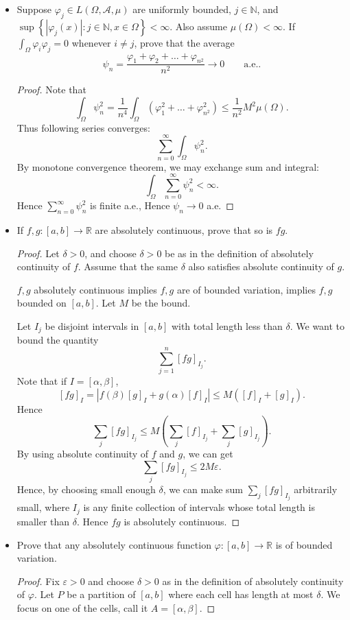 \begin{itemize}
	\item Suppose $\varphi_j \in L(\Omega, \mathcal{A}, \mu)$ are uniformly bounded, $j \in \mathbb{N}$, and $\sup  \left\{ \left| \varphi_j(x) \right| : j \in \mathbb{N} , x \in \Omega\right\}  <\infty $. Also assume $\mu(\Omega) < \infty $. If $\int _\Omega \varphi_i \varphi_j = 0$ whenever $i \neq j$, prove that the average 
		\[
			\psi_n = \frac{\varphi_1 + \varphi_2 + \ldots + \varphi_{n^2}}{n^2} \to 0 \qquad \text{a.e.}
		.\] 
\begin{proof}
	Note that
	\[
		\int_\Omega \psi_n^2 = \frac{1}{n^4}\int _\Omega( \varphi_1 ^2 + \ldots + \varphi_{n^2}^2) \le \frac{1}{n^2} M^2 \mu(\Omega)
	.\] 
	Thus following series converges:
	\[
		\sum_{n = 0}^\infty  \int_\Omega \psi_n^2
	.\] 
	By monotone convergence theorem, we may exchange sum and integral:
\[
		\int_\Omega \sum_{n = 0}^\infty  \psi_n^2< \infty 
	.\]
	Hence $\sum_{n = 0}^\infty  \psi_n^2$ is finite a.e., Hence  $\psi_n \to 0$ a.e.
\end{proof}

	\item If $f, g: [a,b] \to \mathbb{R}$ are absolutely continuous, prove that so is $fg$.
\begin{proof}
	Let $\delta>0$, and choose $\delta>0$ be as in the definition of absolutely continuity of $f$. Assume that the same $\delta$ also satisfies absolute continuity of $g$.

	$f,g$ absolutely continuous implies $f, g$ are of bounded variation, implies $f, g$ bounded on $[a,b]$. Let $M$ be the bound.

	Let  $I_j$ be disjoint intervals in  $[a,b]$ with total length less than $\delta$. We want to bound the quantity
	\[
		\sum_{j = 1}^n [fg]_{I_j}
	.\] 
	Note that if $I = [\alpha, \beta]$,
	\[
		[fg]_{I} = |f(\beta) [g]_{I} + g(\alpha) [f]_{I}| \le M \left( [f]_I + [g]_I \right) 
	.\] 
	Hence
	\[
		\sum_j [fg]_{I_j} \le  M \left( \sum_j [f]_{I_j} + \sum_j [g]_{I_j} \right) 
	.\] 
	By using absolute continuity of $f$ and $g$, we can get
	\[
		\sum_j [fg]_{I_j} \le  2 M \varepsilon
	.\]
	Hence, by choosing small enough $\delta$, we can make sum $\sum_j [fg]_{I_j}$ arbitrarily small, where $I_j$ is any finite collection of intervals whose total length is smaller than $\delta$. Hence $fg$ is absolutely continuous.
\end{proof}

	\item  Prove that any absolutely continuous function $\varphi:[a,b] \to \mathbb{R}$ is of bounded variation.
\begin{proof}
	Fix $\varepsilon>0$ and  choose $\delta>0$ as in the definition of absolutely continuity of $\varphi$. Let $P$ be a partition of $[a,b]$ where each cell has length at most $\delta$. We focus on one of the cells, call it $A = [\alpha, \beta]$. 


\end{proof}
\end{itemize}

